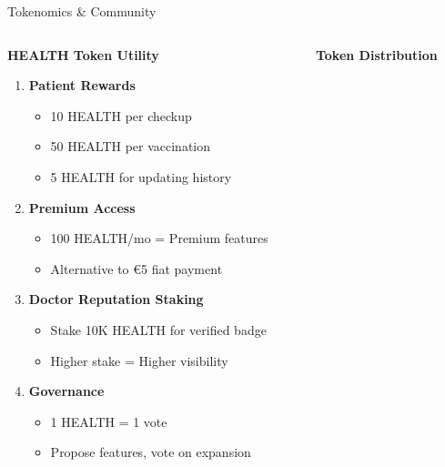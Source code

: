 \documentclass[aspectratio=169,xcolor=dvipsnames,14pt]{beamer}
\begin{document}
\begin{frame}{Tokenomics \& Community}

  \begin{columns}[T]
    \begin{column}{0.5\textwidth}
      \textbf{\textcolor{HederaPurple}{HEALTH Token Utility}}

      \begin{enumerate}
        \item \textbf{Patient Rewards}
        \begin{itemize}
          \item 10 HEALTH per checkup
          \item 50 HEALTH per vaccination
          \item 5 HEALTH for updating history
        \end{itemize}

        \item \textbf{Premium Access}
        \begin{itemize}
          \item 100 HEALTH/mo = Premium features
          \item Alternative to €5 fiat payment
        \end{itemize}

        \item \textbf{Doctor Reputation Staking}
        \begin{itemize}
          \item Stake 10K HEALTH for verified badge
          \item Higher stake = Higher visibility
        \end{itemize}

        \item \textbf{Governance}
        \begin{itemize}
          \item 1 HEALTH = 1 vote
          \item Propose features, vote on expansion
        \end{itemize}
      \end{enumerate}
    \end{column}

    \begin{column}{0.5\textwidth}
      \textbf{\textcolor{HederaPurple}{Token Distribution}}


\end{column}
\end{columns}
\end{frame}
\end{document}
